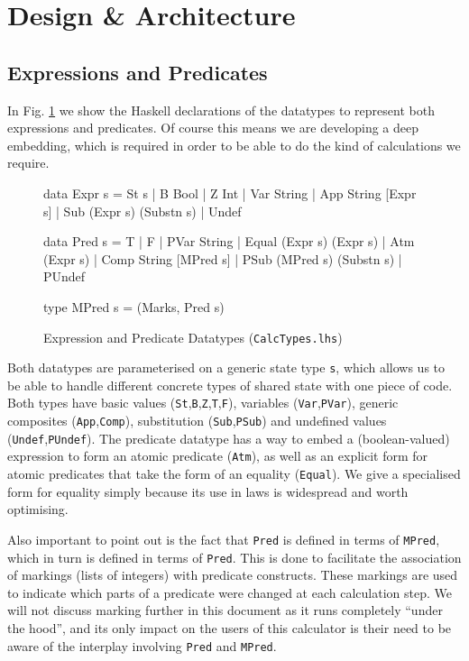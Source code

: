 \section{Design \& Architecture}\label{sec:Design}


\subsection{Expressions and Predicates}\label{ssec:expr-pred}

In Fig. \ref{fig:expr-pred-types} we show the Haskell declarations
of the datatypes to represent both expressions and predicates.
Of course this means we are developing a deep embedding\cite{Gibbons:2014:FDS},
which is required in order to be able to do the kind of calculations we require.
\begin{figure}[tb]
\begin{code}
data Expr s
  = St s | B Bool | Z Int | Var String
  | App String [Expr s] | Sub (Expr s) (Substn s) | Undef

data Pred s
  = T | F | PVar String | Equal (Expr s) (Expr s) | Atm (Expr s)
  | Comp String [MPred s] | PSub (MPred s) (Substn s) | PUndef

type MPred s = (Marks, Pred s)
\end{code}
  \caption{Expression and Predicate Datatypes (\texttt{CalcTypes.lhs})}
  \label{fig:expr-pred-types}
\end{figure}
Both datatypes are parameterised on a generic state type \texttt{s},
which allows us to be able to handle different concrete types
of shared state with one piece of code.
Both types have basic values (\texttt{St},\texttt{B},\texttt{Z},\texttt{T},\texttt{F}),
variables (\texttt{Var},\texttt{PVar}),
generic composites (\texttt{App},\texttt{Comp}),
substitution (\texttt{Sub},\texttt{PSub})
and undefined values (\texttt{Undef},\texttt{PUndef}).
The predicate datatype has a way to embed a (boolean-valued)
expression to form an atomic predicate (\texttt{Atm}),
as well as an explicit form for atomic predicates that take
the form of an equality (\texttt{Equal}).
We give a specialised form for equality simply because
its use in laws is widespread and worth optimising.

Also important to point out is the fact that \texttt{Pred} is
defined in terms of \texttt{MPred}, which in turn is defined
in terms of \texttt{Pred}.
This is done to facilitate the association of markings (lists of integers)
with predicate constructs.
These markings are used to indicate which parts of a predicate
were changed at each calculation step.
We will not discuss marking further in this document
as it runs completely ``under the hood'',
and its only impact on the users of this calculator
is their need to be aware of the interplay involving \texttt{Pred} and \texttt{MPred}.


